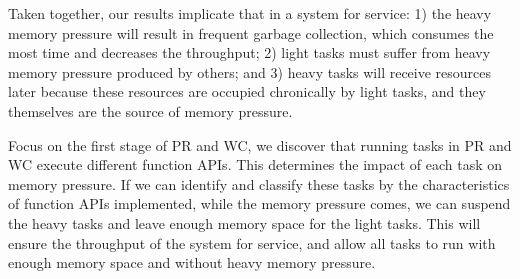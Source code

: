
Taken together, our results implicate that in a system for service: 1) the heavy memory pressure will result in frequent garbage collection, which consumes the most time and decreases the throughput; 2) light tasks must suffer from heavy memory pressure produced by others; and 3) heavy tasks will receive resources later because these resources are occupied chronically by light tasks, and they themselves are the source of memory pressure.

Focus on the first stage of PR and WC, we discover that running tasks in PR and WC execute different function APIs. This determines the impact of each task on memory pressure. If we can identify and classify these tasks by the characteristics of function APIs implemented, while the memory pressure comes, we can suspend the heavy tasks and leave enough memory space for the light tasks. This will ensure the throughput of the system for service, and allow all tasks to run with enough memory space and without heavy memory pressure. 



